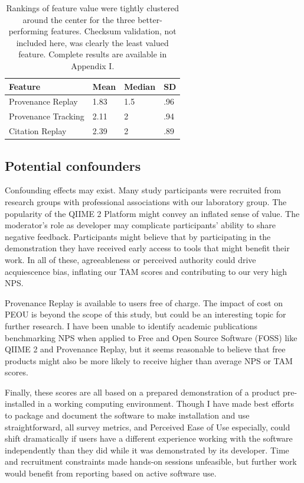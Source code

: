 \begin{table}[htp]
    \centering
    \begin{tabular}{|p{}|p{}|p{}|p{}|}
    \hline
    Feature             & Mean & Median & SD  \\ \hline
    Provenance Replay   & 1.83 & 1.5    & .96 \\
    Provenance Tracking & 2.11 & 2      & .94 \\
    Citation Replay     & 2.39 & 2      & .89 \\ \hline
    \end{tabular}
    \caption[Respondent rankings of feature value]%
    {Rankings of feature value were tightly clustered around the center for the
    three better-performing features. Checksum validation, not included here,
    was clearly the least valued feature. Complete results are available in
    Appendix I.}
    \label{tab:feature_rankings}
\end{table}

\subsection{Potential confounders}

Confounding effects may exist. Many study participants were recruited from
research groups with professional associations with our laboratory group. The
popularity of the QIIME 2 Platform might convey an inflated sense of value. The
moderator’s role as developer may complicate participants’ ability to share
negative feedback. Participants might believe that by participating in the
demonstration they have received early access to tools that might benefit their
work. In all of these, agreeableness or perceived authority could drive
acquiescence bias, inflating our TAM scores and contributing to our very high
NPS.

Provenance Replay is available to users free of charge. The impact of cost on
PEOU is beyond the scope of this study, but could be an interesting topic for
further research. I have been unable to identify academic publications
benchmarking NPS when applied to Free and Open Source Software (FOSS) like QIIME
2 and Provenance Replay, but it seems reasonable to believe that free products
might also be more likely to receive higher than average NPS or TAM scores.

Finally, these scores are all based on a prepared demonstration of a product
pre-installed in a working computing environment. Though I have made best
efforts to package and document the software to make installation and use
straightforward, all survey metrics, and Perceived Ease of Use especially, could
shift dramatically if users have a different experience working with the
software independently than they did while it was demonstrated by its developer.
Time and recruitment constraints made hands-on sessions unfeasible, but further
work would benefit from reporting based on active software use.


